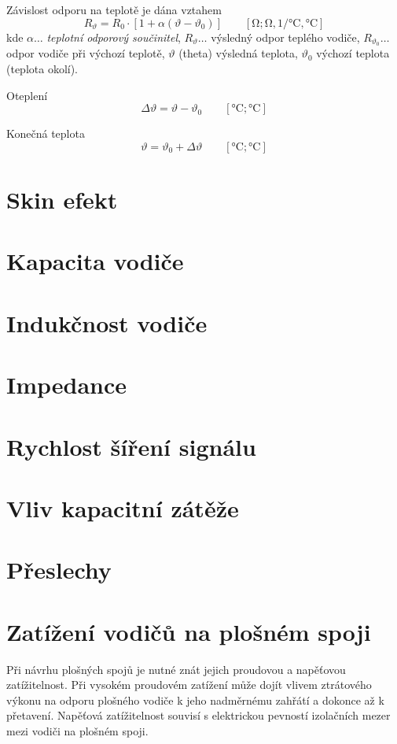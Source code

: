   Závislost odporu na teplotě je dána vztahem \cite[s.~24]{Necasek1972} 
  \begin{equation}\label{ape:eq002}
    R_\vartheta = R_0\cdot[1+\alpha(\vartheta - \vartheta_0)] \qquad[\si{\ohm};\si{\ohm}, 
    \si{1\per\degreeCelsius}, \si{\degreeCelsius}]
  \end{equation}
  kde \(\alpha\ldots\) \emph{teplotní odporový součinitel}, \(R_\vartheta\ldots\) výsledný odpor 
  teplého vodiče,  \(R_{\vartheta_0}\ldots\) odpor vodiče při výchozí teplotě, \(\vartheta\) 
  (theta) výsledná teplota, \(\vartheta_0\) výchozí teplota (teplota okolí).
  
  Oteplení 
  \begin{equation}\label{ape:eq003}
    \Delta\vartheta = \vartheta - \vartheta_0 \qquad[\si{\degreeCelsius}; \si{\degreeCelsius}]
  \end{equation}
  
  Konečná teplota
  \begin{equation}\label{ape:eq004}
    \vartheta = \vartheta_0 + \Delta\vartheta \qquad[\si{\degreeCelsius}; \si{\degreeCelsius}]
  \end{equation}

\section{Skin efekt}
\section{Kapacita vodiče}
\section{Indukčnost vodiče}
\section{Impedance}
\section{Rychlost šíření signálu}
\section{Vliv kapacitní zátěže}
\section{Přeslechy}

\section{Zatížení vodičů na plošném spoji}
  Při návrhu plošných spojů je nutné znát jejich proudovou a napěťovou zatížitelnost. Při
  vysokém proudovém zatížení může dojít vlivem ztrátového výkonu na odporu plošného
  vodiče k jeho nadměrnému zahřátí a dokonce až k přetavení. Napěťová zatížitelnost souvisí
  s elektrickou pevností izolačních mezer mezi vodiči na plošném spoji.
  
